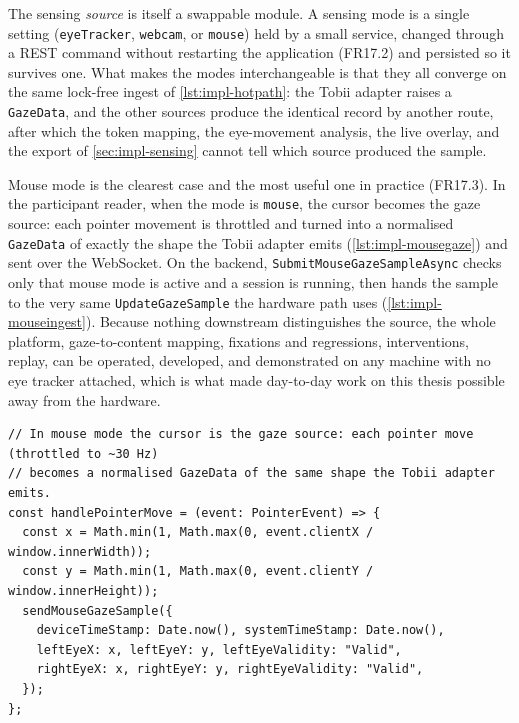 The sensing \emph{source} is itself a swappable module.
A sensing mode is a single setting (\texttt{eyeTracker}, \texttt{webcam}, or \texttt{mouse}) held by a small service, changed through a REST command without restarting the application (FR17.2) and persisted so it survives one.
What makes the modes interchangeable is that they all converge on the same lock-free ingest of \cref{lst:impl-hotpath}: the Tobii adapter raises a \texttt{GazeData}, and the other sources produce the identical record by another route, after which the token mapping, the eye-movement analysis, the live overlay, and the export of \cref{sec:impl-sensing} cannot tell which source produced the sample.

Mouse mode is the clearest case and the most useful one in practice (FR17.3).
In the participant reader, when the mode is \texttt{mouse}, the cursor becomes the gaze source: each pointer movement is throttled and turned into a normalised \texttt{GazeData} of exactly the shape the Tobii adapter emits (\cref{lst:impl-mousegaze}) and sent over the WebSocket.
On the backend, \texttt{SubmitMouseGazeSampleAsync} checks only that mouse mode is active and a session is running, then hands the sample to the very same \texttt{UpdateGazeSample} the hardware path uses (\cref{lst:impl-mouseingest}).
Because nothing downstream distinguishes the source, the whole platform, gaze-to-content mapping, fixations and regressions, interventions, replay, can be operated, developed, and demonstrated on any machine with no eye tracker attached, which is what made day-to-day work on this thesis possible away from the hardware.

\begin{listing}[htbp]
\begin{verbatim}
// In mouse mode the cursor is the gaze source: each pointer move (throttled to ~30 Hz)
// becomes a normalised GazeData of the same shape the Tobii adapter emits.
const handlePointerMove = (event: PointerEvent) => {
  const x = Math.min(1, Math.max(0, event.clientX / window.innerWidth));
  const y = Math.min(1, Math.max(0, event.clientY / window.innerHeight));
  sendMouseGazeSample({
    deviceTimeStamp: Date.now(), systemTimeStamp: Date.now(),
    leftEyeX: x, leftEyeY: y, leftEyeValidity: "Valid",
    rightEyeX: x, rightEyeY: y, rightEyeValidity: "Valid",
  });
};
\end{verbatim}
\caption{Browser as a gaze source (abbreviated from \texttt{ReadingPage.tsx}): pointer events normalised into the same \texttt{GazeData} shape as the Tobii adapter and streamed over the WebSocket.}
\label{lst:impl-mousegaze}
\end{listing}

